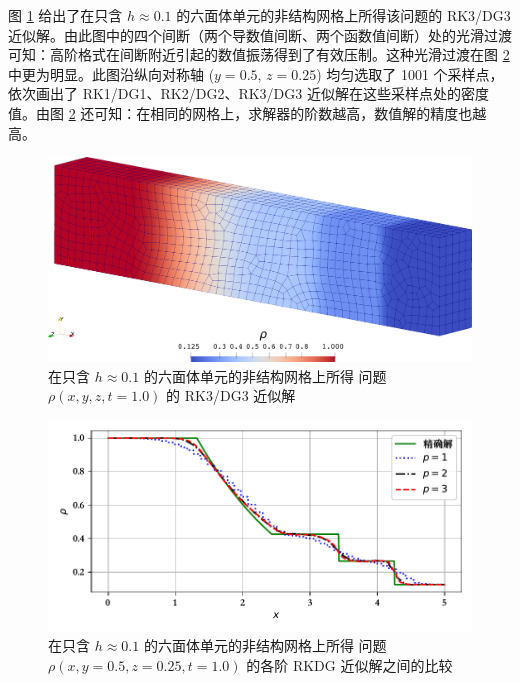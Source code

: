 图 \ref{fig:sod_hexa} 给出了在只含 $h\approx0.1$ 的六面体单元的非结构网格上所得该问题的 RK3/DG3
近似解。由此图中的四个间断（两个导数值间断、两个函数值间断）处的光滑过渡可知：高阶格式在间断附近引起的数值振荡得到了有效压制。这种光滑过渡在图
\ref{fig:sod_hexa_p_vary} 中更为明显。此图沿纵向对称轴 ($y=0.5,\,z=0.25$) 均匀选取了
1001 个采样点，依次画出了 RK1/DG1、RK2/DG2、RK3/DG3 近似解在这些采样点处的密度值。由图 \ref{fig:sod_hexa_p_vary}
还可知：在相同的网格上，求解器的阶数越高，数值解的精度也越高。

\begin{figure}[h!]
\begin{centering}
\includegraphics[width=1\textwidth]{../mdpi/figures/shock_tubes/sod/contour}
\par\end{centering}
\caption{\label{fig:sod_hexa}在只含 $h\approx0.1$ 的六面体单元的非结构网格上所得 问题
$\rho(x,y,z,t=1.0)$ 的 RK3/DG3 近似解}
\end{figure}

\begin{figure}[h!]
\begin{centering}
\includegraphics[width=1\textwidth,height=0.3\textheight]{figures/shock_tubes/sod/result}
\par\end{centering}
\caption{\label{fig:sod_hexa_p_vary}在只含 $h\approx0.1$ 的六面体单元的非结构网格上所得 问题
$\rho(x,y=0.5,z=0.25,t=1.0)$ 的各阶 RKDG 近似解之间的比较}
\end{figure}

